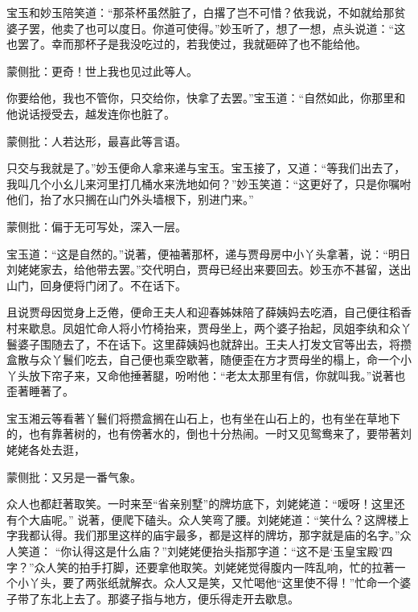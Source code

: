 \begin{parag}
    宝玉和妙玉陪笑道：“那茶杯虽然脏了，白撂了岂不可惜？依我说，不如就给那贫婆子罢，他卖了也可以度日。你道可使得。”妙玉听了，想了一想，点头说道：“这也罢了。幸而那杯子是我没吃过的，若我使过，我就砸碎了也不能给他。\begin{note}蒙侧批：更奇！世上我也见过此等人。\end{note}你要给他，我也不管你，只交给你，快拿了去罢。”宝玉道：“自然如此，你那里和他说话授受去，越发连你也脏了。\begin{note}蒙侧批：人若达形，最喜此等言语。\end{note}只交与我就是了。”妙玉便命人拿来递与宝玉。宝玉接了，又道：“等我们出去了，我叫几个小幺儿来河里打几桶水来洗地如何？”妙玉笑道：“这更好了，只是你嘱咐他们，抬了水只搁在山门外头墙根下，别进门来。”\begin{note}蒙侧批：偏于无可写处，深入一层。\end{note}宝玉道：“这是自然的。”说著，便袖著那杯，递与贾母房中小丫头拿著，说：“明日刘姥姥家去，给他带去罢。”交代明白，贾母已经出来要回去。妙玉亦不甚留，送出山门，回身便将门闭了。不在话下。
\end{parag}


\begin{parag}
    且说贾母因觉身上乏倦，便命王夫人和迎春姊妹陪了薛姨妈去吃酒，自己便往稻香村来歇息。凤姐忙命人将小竹椅抬来，贾母坐上，两个婆子抬起，凤姐李纨和众丫鬟婆子围随去了，不在话下。这里薛姨妈也就辞出。王夫人打发文官等出去，将攒盒散与众丫鬟们吃去，自己便也乘空歇著，随便歪在方才贾母坐的榻上，命一个小丫头放下帘子来，又命他捶著腿，吩咐他：“老太太那里有信，你就叫我。”说著也歪著睡著了。
\end{parag}


\begin{parag}
    宝玉湘云等看著丫鬟们将攒盒搁在山石上，也有坐在山石上的，也有坐在草地下的，也有靠著树的，也有傍著水的，倒也十分热闹。一时又见鸳鸯来了，要带著刘姥姥各处去逛，\begin{note}蒙侧批：又另是一番气象。\end{note}众人也都赶著取笑。一时来至“省亲别墅”的牌坊底下，刘姥姥道：“嗳呀！这里还有个大庙呢。” 说著，便爬下磕头。众人笑弯了腰。刘姥姥道：“笑什么？这牌楼上字我都认得。我们那里这样的庙宇最多，都是这样的牌坊，那字就是庙的名字。”众人笑道： “你认得这是什么庙？”刘姥姥便抬头指那字道：“这不是‘玉皇宝殿’四字？”众人笑的拍手打脚，还要拿他取笑。刘姥姥觉得腹内一阵乱响，忙的拉著一个小丫头，要了两张纸就解衣。众人又是笑，又忙喝他“这里使不得！”忙命一个婆子带了东北上去了。那婆子指与地方，便乐得走开去歇息。
\end{parag}


